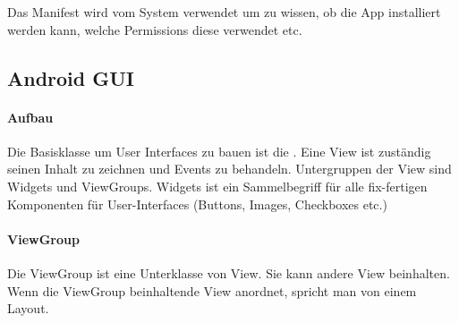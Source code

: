 Das Manifest wird vom System verwendet um zu wissen, ob die App installiert werden kann, welche Permissions diese verwendet etc.

\subsection{Android GUI}
\paragraph{Aufbau} Die Basisklasse um User Interfaces zu bauen ist die . Eine View ist zuständig seinen Inhalt zu zeichnen und Events zu behandeln. Untergruppen der View sind Widgets und ViewGroups. Widgets ist ein Sammelbegriff für alle fix-fertigen Komponenten für User-Interfaces (Buttons, Images, Checkboxes etc.)
\paragraph{ViewGroup} Die ViewGroup ist eine Unterklasse von View. Sie kann andere View beinhalten. Wenn die ViewGroup beinhaltende View anordnet, spricht man von einem Layout.
